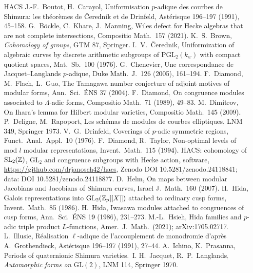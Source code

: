 \documentclass[11pt]{amsart}
\theoremstyle{plain}
\theoremstyle{definition}
\theoremstyle{remark}
\newcommand{\GL}{\mathrm{GL}}\newcommand{\SL}{\mathrm{SL}}\newcommand{\PGL}{\mathrm{PGL}}
\begin{document}
\begin{thebibliography}{HACS}\small
{} J.-F.~Boutot, H.~Carayol, Uniformisation $p$-adique des courbes de Shimura: les théorèmes de Čerednik et de Drinfeld, Astérisque 196--197 (1991), 45--158.
 G.~Böckle, C.~Khare, J.~Manning, Wiles defect for Hecke algebras that are not complete intersections, Compositio Math.\ 157 (2021).
 K.~S.~Brown, \emph{Cohomology of groups}, GTM 87, Springer.
 I.~V.~Čerednik, Uniformization of algebraic curves by discrete arithmetic subgroups of $\PGL_2(k_w)$ with compact quotient spaces, Mat.\ Sb.\ 100 (1976).
 G.~Chenevier, Une correspondance de Jacquet--Langlands $p$-adique, Duke Math.\ J.\ 126 (2005), 161--194.
 F.~Diamond, M.~Flach, L.~Guo, The Tamagawa number conjecture of adjoint motives of modular forms, Ann.\ Sci.\ ÉNS 37 (2004).
 F.~Diamond, On congruence modules associated to $\Lambda$-adic forms, Compositio Math.\ 71 (1989), 49--83.
 M.~Dimitrov, On Ihara's lemma for Hilbert modular varieties, Compositio Math.\ 145 (2009).
 P.~Deligne, M.~Rapoport, Les schémas de modules de courbes elliptiques, LNM 349, Springer 1973.
 V.~G.~Drinfeld, Coverings of $p$-adic symmetric regions, Funct.\ Anal.\ Appl.\ 10 (1976).
 F.~Diamond, R.~Taylor, Non-optimal levels of mod $l$ modular representations, Invent.\ Math.\ 115 (1994).
 HACS: cohomology of $\SL_2(\Z)$, $\GL_2$ and congruence subgroups with Hecke action, software, \url{https://github.com/drjanosch42/hacs}, Zenodo DOI 10.5281/zenodo.24118841; data: DOI 10.5281/zenodo.24118877.
 D.~Helm, On maps between modular Jacobians and Jacobians of Shimura curves, Israel J.\ Math.\ 160 (2007).
 H.~Hida, Galois representations into $\GL_2(\Z_p[[X]])$ attached to ordinary cusp forms, Invent.\ Math.\ 85 (1986).
 H.~Hida, Iwasawa modules attached to congruences of cusp forms, Ann.\ Sci.\ ÉNS 19 (1986), 231--273.
 M.-L.~Hsieh, Hida families and $p$-adic triple product $L$-functions, Amer.\ J.\ Math.\ (2021); arXiv:1705.02717.
 L.~Illusie, Réalisation $\ell$-adique de l'accouplement de monodromie d'après A.~Grothendieck, Astérisque 196--197 (1991), 27--44.
 A.~Ichino, K.~Prasanna, Periods of quaternionic Shimura varieties.~I.
 H.~Jacquet, R.~P.~Langlands, \emph{Automorphic forms on $\GL(2)$}, LNM 114, Springer 1970.

\end{thebibliography}
\end{document}
